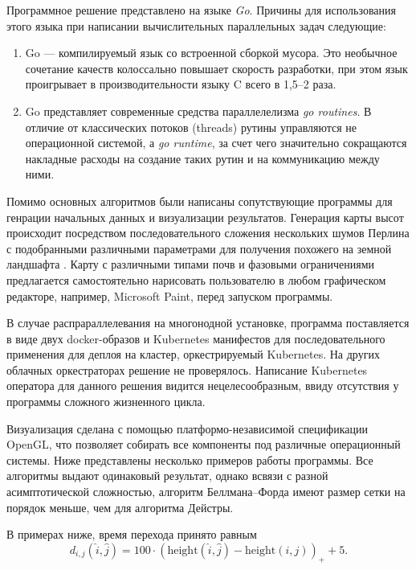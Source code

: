 Программное решение представлено на языке \textit{Go}. Причины для использования этого языка при написании вычислительных параллельных задач следующие:
\begin{enumerate}
    \item Go --- компилируемый язык со встроенной сборкой мусора. Это необычное сочетание качеств колоссально повышает скорость разработки, при этом язык проигрывает в производительности языку C всего в 1,5--2 раза.
    \item Go представляет современные средства параллелелизма \textit{go routines}. В отличие от классических потоков (threads) рутины управляются не операционной системой, а \textit{go runtime}, за счет чего значительно сокращаются накладные расходы на создание таких рутин и на коммуникацию между ними.
\end{enumerate}

Помимо основных алгоритмов были написаны сопутствующие программы для генрации начальных данных и визуализации результатов. Генерация карты высот происходит посредством последовательного сложения нескольких шумов Перлина с подобранными различными параметрами для получения похожего на земной ландшафта \cite{perlin}. Карту с различными типами почв и фазовыми ограничениями предлагается самостоятельно нарисовать пользователю в любом графическом редакторе, например, Microsoft Paint, перед запуском программы.

В случае распрараллелевания на многонодной установке, программа поставляется в виде двух docker-образов и Ku\-ber\-ne\-tes манифестов для последовательного применения для деплоя на кластер, оркестрируемый Kubernetes. На других облачных оркестраторах решение не проверялось. Написание Ku\-ber\-ne\-tes оператора для данного решения видится нецелесообразным, ввиду отсутствия у программы сложного жизненного цикла.

Визуализация сделана с помощью платформо-независимой спецификации OpenGL, что позволяет собирать все компоненты под различные операционный системы. Ниже представлены несколько примеров работы программы. Все алгоритмы выдают одинаковый результат, однако всвязи с разной асимптотической сложностью, алгоритм Беллмана--Форда имеют размер сетки на порядок меньше, чем для алгоритма Дейстры.

В примерах ниже, время перехода принято равным
\[
    d_{i,j}(\hat i, \hat j) = 100\cdot(\mathrm{height}(\hat i, \hat j) - \mathrm{height}(i, j))_{+} + 5.
\]

